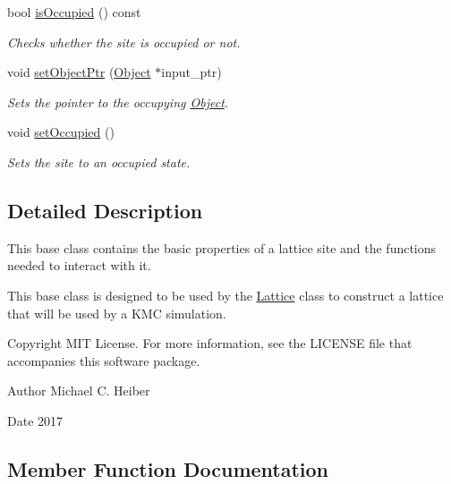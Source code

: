 \begin{DoxyCompactItemize}
bool \hyperlink{class_site_a30991b768ded0bb441c5bb54a789160a}{is\+Occupied} () const
\begin{DoxyCompactList}\small\item\em Checks whether the site is occupied or not. \end{DoxyCompactList}\item 
void \hyperlink{class_site_a9a0d305451d7732dbb193e7fd2f502ca}{set\+Object\+Ptr} (\hyperlink{class_object}{Object} $\ast$input\+\_\+ptr)
\begin{DoxyCompactList}\small\item\em Sets the pointer to the occupying \hyperlink{class_object}{Object}. \end{DoxyCompactList}\item 
\mbox{\label{class_site_ab85bec20c3a6067a7dca659221d57d25}} 
void \hyperlink{class_site_ab85bec20c3a6067a7dca659221d57d25}{set\+Occupied} ()
\begin{DoxyCompactList}\small\item\em Sets the site to an occupied state. \end{DoxyCompactList}\end{DoxyCompactItemize}


\subsection{Detailed Description}
This base class contains the basic properties of a lattice site and the functions needed to interact with it. 

This base class is designed to be used by the \hyperlink{class_lattice}{Lattice} class to construct a lattice that will be used by a K\+MC simulation. \begin{DoxyCopyright}{Copyright}
M\+IT License. For more information, see the L\+I\+C\+E\+N\+SE file that accompanies this software package. 
\end{DoxyCopyright}
\begin{DoxyAuthor}{Author}
Michael C. Heiber 
\end{DoxyAuthor}
\begin{DoxyDate}{Date}
2017 
\end{DoxyDate}


\subsection{Member Function Documentation}
\mbox{\label{class_site_a46ff077954e39046b493ee1ea57a9c93}} 

